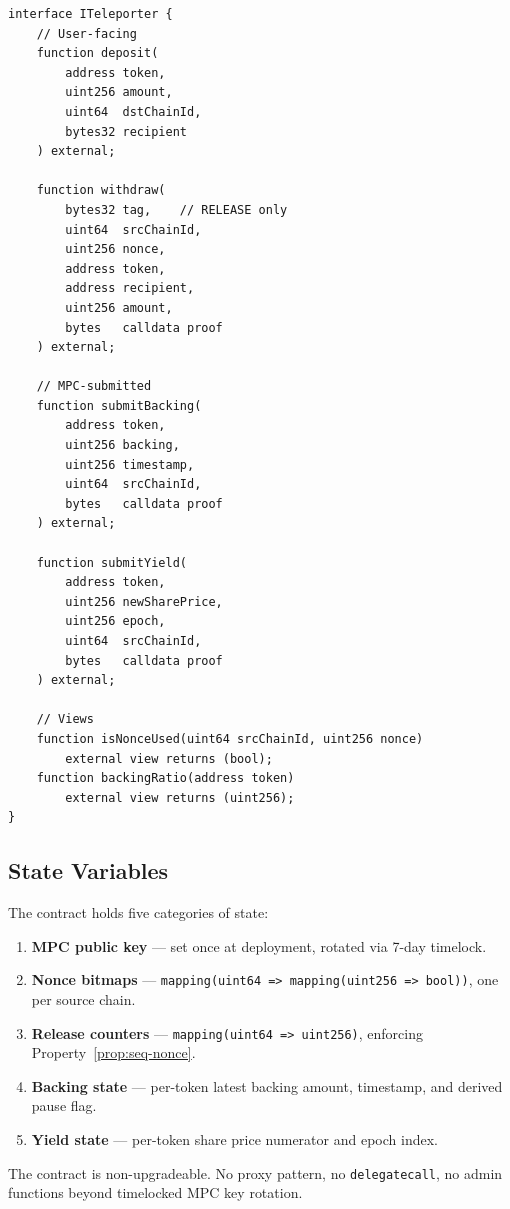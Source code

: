 \documentclass[11pt]{article}
\begin{document}
\begin{lstlisting}[language=Solidity,caption={Core Teleporter interface (simplified)}]
interface ITeleporter {
    // User-facing
    function deposit(
        address token,
        uint256 amount,
        uint64  dstChainId,
        bytes32 recipient
    ) external;

    function withdraw(
        bytes32 tag,    // RELEASE only
        uint64  srcChainId,
        uint256 nonce,
        address token,
        address recipient,
        uint256 amount,
        bytes   calldata proof
    ) external;

    // MPC-submitted
    function submitBacking(
        address token,
        uint256 backing,
        uint256 timestamp,
        uint64  srcChainId,
        bytes   calldata proof
    ) external;

    function submitYield(
        address token,
        uint256 newSharePrice,
        uint256 epoch,
        uint64  srcChainId,
        bytes   calldata proof
    ) external;

    // Views
    function isNonceUsed(uint64 srcChainId, uint256 nonce)
        external view returns (bool);
    function backingRatio(address token)
        external view returns (uint256);
}
\end{lstlisting}

\subsection{State Variables}

The contract holds five categories of state:

\begin{enumerate}[nosep]
  \item \textbf{MPC public key} --- set once at deployment, rotated via 7-day timelock.
  \item \textbf{Nonce bitmaps} --- \texttt{mapping(uint64 => mapping(uint256 => bool))}, one per source chain.
  \item \textbf{Release counters} --- \texttt{mapping(uint64 => uint256)}, enforcing Property~\ref{prop:seq-nonce}.
  \item \textbf{Backing state} --- per-token latest backing amount, timestamp, and derived pause flag.
  \item \textbf{Yield state} --- per-token share price numerator and epoch index.
\end{enumerate}

The contract is non-upgradeable. No proxy pattern, no \texttt{delegatecall}, no admin functions beyond timelocked MPC key rotation.
\end{document}
